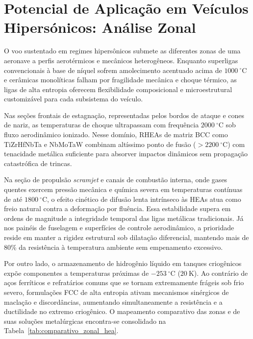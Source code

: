 \section{Potencial de Aplicação em Veículos Hipersónicos: Análise Zonal}\label{sec:potencial_aplicacao_hipersonica}

O voo sustentado em regimes hipersônicos submete as diferentes zonas de uma aeronave a perfis aerotérmicos e mecânicos heterogêneos. Enquanto superligas convencionais à base de níquel sofrem amolecimento acentuado acima de $1000~^\circ\mathrm{C}$ e cerâmicas monolíticas falham por fragilidade mecânica e choque térmico, as ligas de alta entropia oferecem flexibilidade composicional e microestrutural customizável para cada subsistema do veículo.

Nas seções frontais de estagnação, representadas pelos bordos de ataque e cones de nariz, as temperaturas de choque ultrapassam com frequência $2000~^\circ\mathrm{C}$ sob fluxo aerodinâmico ionizado. Nesse domínio, RHEAs de matriz BCC como TiZrHfNbTa e NbMoTaW combinam altíssimo ponto de fusão ($> 2200~^\circ\mathrm{C}$) com tenacidade metálica suficiente para absorver impactos dinâmicos sem propagação catastrófica de trincas.

Na seção de propulsão \emph{scramjet} e canais de combustão interna, onde gases quentes exercem pressão mecânica e química severa em temperaturas contínuas de até $1800~^\circ\mathrm{C}$, o efeito cinético de difusão lenta intrínseco às HEAs atua como freio natural contra a deformação por fluência. Essa estabilidade supera em ordens de magnitude a integridade temporal das ligas metálicas tradicionais. Já nos painéis de fuselagem e superfícies de controle aerodinâmico, a prioridade reside em manter a rigidez estrutural sob dilatação diferencial, mantendo mais de 80\% da resistência à temperatura ambiente sem empenamento excessivo.

Por outro lado, o armazenamento de hidrogênio líquido em tanques criogênicos expõe componentes a temperaturas próximas de $-253~^\circ\mathrm{C}$ ($20~\mathrm{K}$). Ao contrário de aços ferríticos e refratários comuns que se tornam extremamente frágeis sob frio severo, formulações FCC de alta entropia ativam mecanismos sinérgicos de maclação e discordâncias, aumentando simultaneamente a resistência e a ductilidade no extremo criogênico. O mapeamento comparativo das zonas e de suas soluções metalúrgicas encontra-se consolidado na Tabela~\ref{tab:comparativo_zonal_hea}.

